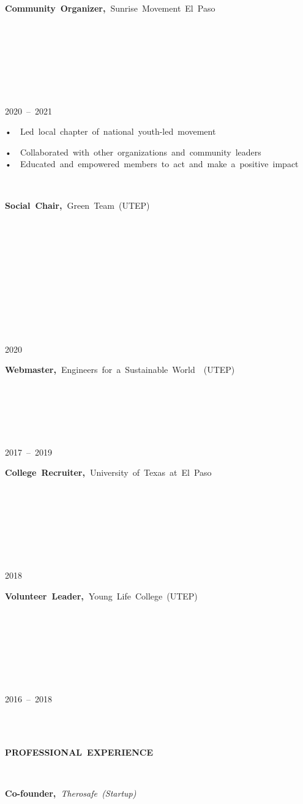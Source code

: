 \documentclass[
]{article}
\begin{document}
~

\textbf{Community~Organizer,~}Sunrise~Movement~El~Paso~

~

~

~

~

2020~--~2021~

•~~Led~local~chapter~of~national~youth-led~movement~~

•~~Collaborated~with~other~organizations~and~community~leaders~~\\
•~~Educated~and~empowered~members~to~act~and~make~a~positive~impact~

~

\textbf{Social~Chair,~}Green~Team~(UTEP)~

~

~

~

~

~

~

2020~

\textbf{Webmaster,~}Engineers~for~a~Sustainable~World~~(UTEP)~~

~

~

~

2017~--~2019~

\textbf{College~Recruiter,~}University~of~Texas~at~El~Paso~

~

~

~

~

2018~

\textbf{Volunteer~Leader,~}Young~Life~College~(UTEP)~~~

~

~

~

~

2016~--~2018~

~\\
\strut ~\\
\textbf{PROFESSIONAL~EXPERIENCE~}

~

\textbf{Co-founder,~}\emph{Therosafe~(Startup)}\textbf{~}

\textbf{~}

\textbf{~}

\textbf{~}

\textbf{~}

\textbf{~}
\end{document}
